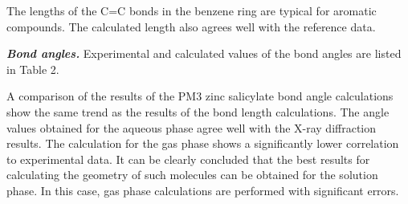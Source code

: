 \begin{multicols}{2}
The lengths of the C=C bonds in the benzene ring are typical for
aromatic compounds. The calculated length also agrees well with the
reference data.

{\bfseries \emph{Bond angles.}} Experimental and calculated values of the
bond angles are listed in Table 2.

A comparison of the results of the PM3 zinc salicylate bond angle
calculations show the same trend as the results of the bond length
calculations. The angle values \hspace{0pt}\hspace{0pt}obtained for the
aqueous phase agree well with the X-ray diffraction results. The
calculation for the gas phase shows a significantly lower correlation to
experimental data. It can be clearly concluded that the best results for
calculating the geometry of such molecules can be obtained for the
solution phase. In this case, gas phase calculations are performed with
significant errors.
\end{multicols}


